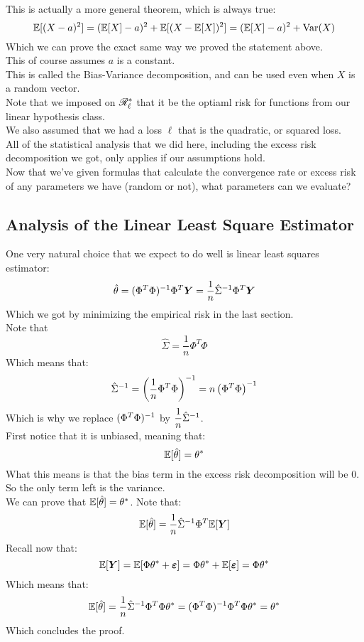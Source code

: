 \documentclass[12pt]{article}
\begin{document}
This is actually a more general theorem,
which is always true:
\[ \mathbb{E}[(X-a)^2] = (\mathbb{E}[X] - a)^2
+ \mathbb{E}[(X - \mathbb{E}[X])^2]
= (\mathbb{E}[X] - a)^2 + \text{Var}(X) \]
Which we can prove the exact same
way we proved the statement above. \\
This of course assumes $a$
is a constant. \\
This is called the Bias-Variance
decomposition, and can be used
even when $X$
is a random vector. \\

Note that we imposed on $\mathscr{R}_{\ell}^*$
that it be the optiaml risk for functions
from our linear hypothesis class. \\
We also assumed that we had a loss $\ell$
that is the quadratic, or squared loss. \\
All of the statistical analysis that we did 
here, including the excess risk decomposition we got,
only applies if our assumptions hold. \\

Now that we've given formulas that calculate
the convergence rate or excess risk
of any parameters we have (random or not),
what parameters can we evaluate? \\

\newpage

\subsection*{Analysis of the Linear Least Square 
Estimator}

One very natural choice that we expect
to do well is linear least squares
estimator:
\[ \hat{\theta} = (\Phi^T\Phi)^{-1}\Phi^T\boldsymbol{Y}
= \dfrac{1}{n}\hat{\Sigma}^{-1} \Phi^T\boldsymbol{Y} \]
Which we got by minimizing the empirical risk
in the last section. \\

Note that
\[ \hat{\Sigma} = \dfrac{1}{n}\Phi^T\Phi \]
Which means that:
\[ {\hat{\Sigma}}^{-1} 
= \left( \dfrac{1}{n}\Phi^T\Phi \right)^{-1}
= n\left( \Phi^T\Phi \right)^{-1} \]
Which is why we replace $(\Phi^T\Phi)^{-1}$
by $\dfrac{1}{n}\hat{\Sigma}^{-1}$. \\

First notice that it is unbiased, meaning that:
\[ \mathbb{E}[\hat{\theta}] = \theta^* \]
What this means is that the bias term in
the excess risk decomposition will be $0$. \\
So the only term left is the variance. \\

We can prove that $\mathbb{E}[\hat{\theta}] = \theta^*$.
Note that:
\[ \mathbb{E}[\hat{\theta}]
= \dfrac{1}{n} \hat{\Sigma}^{-1} \Phi^T \mathbb{E}[\boldsymbol{Y}] \]
Recall now that:
\[ \mathbb{E}[\boldsymbol{Y}] 
= \mathbb{E}[\Phi \theta^* + \boldsymbol{\varepsilon}]
= \Phi \theta^* + \mathbb{E}[\boldsymbol{\varepsilon}] = \Phi \theta^* \]
Which means that:
\[ \mathbb{E}[\hat{\theta}] = 
\dfrac{1}{n} \hat{\Sigma}^{-1} \Phi^T \Phi \theta^*
= (\Phi^T\Phi)^{-1} \Phi^T \Phi \theta^* 
= \theta^* \]
Which concludes the proof. \\
\end{document}
